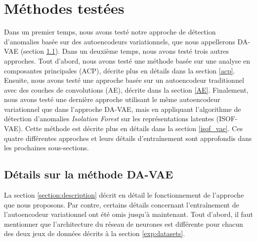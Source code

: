 \section{Méthodes testées} \label{exp:methods}
 
Dans un premier temps, nous avons testé notre approche de détection d'anomalies basée sur des autoencodeurs variationnels, que nous appellerons DA-VAE (section \ref{DA_VAE}). Dans un deuxième temps, nous avons testé trois autres approches. Tout d'abord, nous avons testé une méthode basée sur une analyse en composantes principales (ACP), décrite plus en détails dans la section \ref{acp}. Ensuite, nous avons testé une approche basée sur un autoencodeur traditionnel avec des couches de convolutions (AE), décrite dans la section \ref{AE}. Finalement, nous avons testé une dernière approche utilisant le même autoencodeur variationnel que dans l'approche DA-VAE, mais en appliquant l'algorithme de détection d'anomalies \textit{Isolation Forest} \citep{4781136} sur les représentations latentes (ISOF-VAE). Cette méthode est décrite plus en détails dans la section \ref{isof_vae}. Ces quatre différentes approches et leurs détails d'entraînement sont approfondis dans les prochaines sous-sections.

\subsection{Détails sur la méthode DA-VAE} \label{DA_VAE}

La section \ref{section:description} décrit en détail le fonctionnement de l'approche que nous proposons. Par contre, certains détails concernant l'entraînement de l'autoencodeur variationnel ont été omis jusqu'à maintenant. Tout d'abord, il faut mentionner que l'architecture du réseau de neurones est différente pour chacun des deux jeux de données décrits à la section \ref{exp:datasets}.

